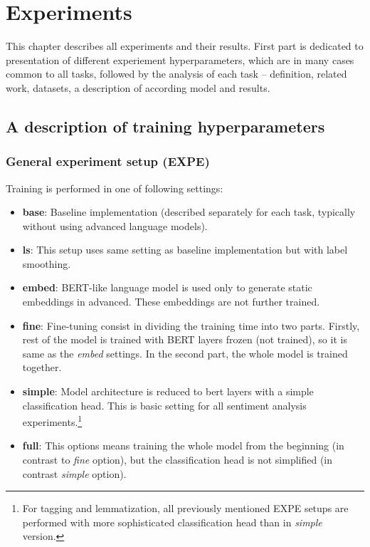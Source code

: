 \chapter{Experiments}
This chapter describes all experiments and their results. First part is dedicated to presentation of different experiement hyperparameters, which are in many cases common to all tasks, followed by the analysis of each task -- definition, related work, datasets, a description of according model and results.
\section{A description of training hyperparameters}
\label{sec:expe}
\subsection{General experiment setup (EXPE)}
Training is performed in one of following settings:
\begin{itemize}
\item \textbf{base}: Baseline implementation (described separately for each task, typically without using advanced language models).
\item \textbf{ls}: This setup uses same setting as baseline implementation but with label smoothing.
\item \textbf{embed}: BERT-like language model is used only to generate static embeddings in advanced. These embeddings are not further trained.
\item \textbf{fine}: Fine-tuning consist in dividing the training time into two parts. Firstly, rest of the model is trained with BERT layers frozen (not trained), so it is same as the \textit{embed} settings. In the second part, the whole model is trained together.
\item \textbf{simple}: Model architecture is reduced to bert layers with a simple classification head. This is basic setting for all sentiment analysis experiments.\footnote{For tagging and lemmatization, all previously mentioned EXPE setups are performed with more sophisticated classification head than in \textit{simple} version.} 
\item \textbf{full}: This options means training the whole model from the beginning (in contrast to \textit{fine} option), but the classification head is not simplified (in contrast \textit{simple} option).
\end{itemize}
